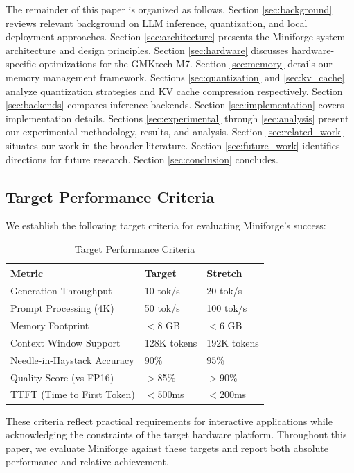 The remainder of this paper is organized as follows. Section \ref{sec:background} reviews relevant background on LLM inference, quantization, and local deployment approaches. Section \ref{sec:architecture} presents the Miniforge system architecture and design principles. Section \ref{sec:hardware} discusses hardware-specific optimizations for the GMKtech M7. Section \ref{sec:memory} details our memory management framework. Sections \ref{sec:quantization} and \ref{sec:kv_cache} analyze quantization strategies and KV cache compression respectively. Section \ref{sec:backends} compares inference backends. Section \ref{sec:implementation} covers implementation details. Sections \ref{sec:experimental} through \ref{sec:analysis} present our experimental methodology, results, and analysis. Section \ref{sec:related_work} situates our work in the broader literature. Section \ref{sec:future_work} identifies directions for future research. Section \ref{sec:conclusion} concludes.

\subsection{Target Performance Criteria}

We establish the following target criteria for evaluating Miniforge's success:

\begin{table}[h]
\centering
\caption{Target Performance Criteria}
\label{tab:target_criteria}
\begin{tabular}{lll}
\toprule
\textbf{Metric} & \textbf{Target} & \textbf{Stretch} \\
\midrule
Generation Throughput & 10 tok/s & 20 tok/s \\
Prompt Processing (4K) & 50 tok/s & 100 tok/s \\
Memory Footprint & $<$8 GB & $<$6 GB \\
Context Window Support & 128K tokens & 192K tokens \\
Needle-in-Haystack Accuracy & 90\% & 95\% \\
Quality Score (vs FP16) & $>$85\% & $>$90\% \\
TTFT (Time to First Token) & $<$500ms & $<$200ms \\
\bottomrule
\end{tabular}
\end{table}

These criteria reflect practical requirements for interactive applications while acknowledging the constraints of the target hardware platform. Throughout this paper, we evaluate Miniforge against these targets and report both absolute performance and relative achievement.

